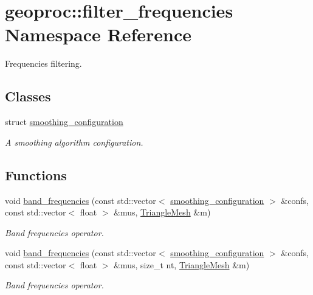 \hypertarget{namespacegeoproc_1_1filter__frequencies}{}\section{geoproc\+:\+:filter\+\_\+frequencies Namespace Reference}
\label{namespacegeoproc_1_1filter__frequencies}


Frequencies filtering.  


\subsection*{Classes}
\begin{DoxyCompactItemize}
\item 
struct \hyperlink{structgeoproc_1_1filter__frequencies_1_1smoothing__configuration}{smoothing\+\_\+configuration}
\begin{DoxyCompactList}\small\item\em A smoothing algorithm configuration. \end{DoxyCompactList}\end{DoxyCompactItemize}
\subsection*{Functions}
\begin{DoxyCompactItemize}
\item 
void \hyperlink{namespacegeoproc_1_1filter__frequencies_aa795010d1cd2daaafb0b1f60ee3ab1cd}{band\+\_\+frequencies} (const std\+::vector$<$ \hyperlink{structgeoproc_1_1filter__frequencies_1_1smoothing__configuration}{smoothing\+\_\+configuration} $>$ \&confs, const std\+::vector$<$ float $>$ \&mus, \hyperlink{classgeoproc_1_1TriangleMesh}{Triangle\+Mesh} \&m)
\begin{DoxyCompactList}\small\item\em Band frequencies operator. \end{DoxyCompactList}\item 
void \hyperlink{namespacegeoproc_1_1filter__frequencies_a2af31b5e6e8c4d0f5de51c488c1d69b2}{band\+\_\+frequencies} (const std\+::vector$<$ \hyperlink{structgeoproc_1_1filter__frequencies_1_1smoothing__configuration}{smoothing\+\_\+configuration} $>$ \&confs, const std\+::vector$<$ float $>$ \&mus, size\+\_\+t nt, \hyperlink{classgeoproc_1_1TriangleMesh}{Triangle\+Mesh} \&m)
\begin{DoxyCompactList}\small\item\em Band frequencies operator. \end{DoxyCompactList}\end{DoxyCompactItemize}


